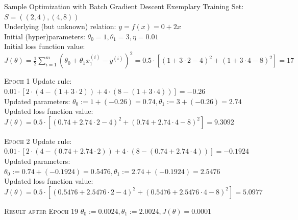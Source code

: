 \documentclass[document.tex]{subfiles}
\begin{document}
    \begin{frame}{Sample Optimization with Batch Gradient Descent}
        Exemplary Training Set: $S = ((2, 4), (4, 8))$ \\
        Underlying (but unknown) relation: $y = f(x) = 0 + 2x$ \\
        Initial (hyper)parameters: $\theta_0=1, \theta_1=3, \eta = 0.01$ \\
        Initial loss function value: $J(\theta) = \frac{1}{2} \sum_{i=1}^m (\theta_0 + \theta_1x_1^{(i)} - y^{(i)})^2 = 0.5 \cdot [(1 + 3 \cdot 2 - 4)^2 + (1 + 3 \cdot 4 - 8)^2] = 17$
        
        \begin{alertblock}{\textsc{Epoch 1}}
            Update rule: $0.01 \cdot [2 \cdot (4 - (1 + 3 \cdot 2)) + 4 \cdot (8 - (1 + 3 \cdot 4))] = -0.26$ \\
            Updated parameters: $\theta_0 := 1 + (-0.26) = 0.74, \theta_1 := 3 + (-0.26) = 2.74$ \\
            Updated loss function value: $J(\theta) = 0.5 \cdot [(0.74 + 2.74 \cdot 2 - 4)^2 + (0.74 + 2.74 \cdot 4 - 8)^2] = 9.3092$
        \end{alertblock}
        
        \begin{alertblock}{\textsc{Epoch 2}}
            Update rule: $0.01 \cdot [2 \cdot (4 - (0.74 + 2.74 \cdot 2)) + 4 \cdot (8 - (0.74 + 2.74 \cdot 4))] = -0.1924$ \\
            Updated parameters: $\theta_0 := 0.74 + (-0.1924) = 0.5476, \theta_1 := 2.74 + (-0.1924) = 2.5476$ \\
            Updated loss function value: $J(\theta) = 0.5 \cdot [(0.5476 + 2.5476 \cdot 2 - 4)^2 + (0.5476 + 2.5476 \cdot 4 - 8)^2] = 5.0977$
        \end{alertblock}
        
        \begin{alertblock}{\textsc{Result after Epoch 19}}
            $\theta_0 := 0.0024, \theta_1 := 2.0024, J(\theta) = 0.0001$ \\
        \end{alertblock}
    \end{frame}
\end{document}

